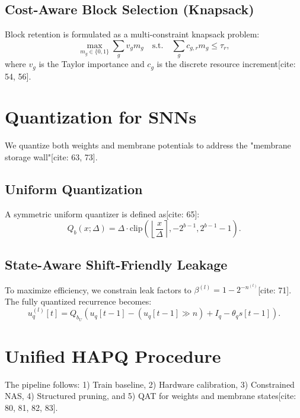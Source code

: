 \documentclass[10pt,journal,compsoc]{IEEEtran}
\begin{document}
\subsection{Cost-Aware Block Selection (Knapsack)}
Block retention is formulated as a multi-constraint knapsack problem:
\begin{equation}
\max_{m_g \in \{0,1\}} \sum_g v_g m_g \quad \text{s.t.} \quad \sum_g c_{g,r} m_g \leq \tau_r,
\end{equation}
where $v_g$ is the Taylor importance and $c_g$ is the discrete resource increment[cite: 54, 56].

\section{Quantization for SNNs}
We quantize both weights and membrane potentials to address the "membrane storage wall"[cite: 63, 73].

\subsection{Uniform Quantization}
A symmetric uniform quantizer is defined as[cite: 65]:
\begin{equation}
Q_b(x;\Delta) = \Delta \cdot \text{clip}\left(\left\lfloor \frac{x}{\Delta} \right\rceil, -2^{b-1}, 2^{b-1}-1\right).
\end{equation}

\subsection{State-Aware Shift-Friendly Leakage}
To maximize efficiency, we constrain leak factors to $\beta^{(l)} = 1 - 2^{-n^{(l)}}$[cite: 71]. The fully quantized recurrence becomes:
\begin{equation}
u_q^{(l)}[t] = Q_{b_U} \left( u_q[t-1] - (u_q[t-1] \gg n) + I_q - \theta_q s[t-1] \right).
\end{equation}

\section{Unified HAPQ Procedure}
The pipeline follows: 1) Train baseline, 2) Hardware calibration, 3) Constrained NAS, 4) Structured pruning, and 5) QAT for weights and membrane states[cite: 80, 81, 82, 83].
\end{document}
